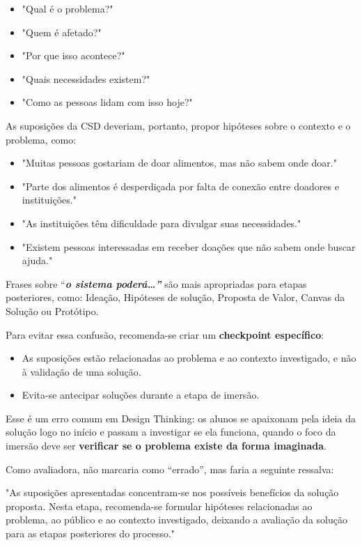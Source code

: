 \documentclass[
  sigconf,
  nonacm, %
  language=portuguese
]{acmart}
\begin{document}
\begin{itemize}[leftmargin=14pt,itemsep=2pt,topsep=4pt]
  \item "Qual é o problema?"
  \item "Quem é afetado?"
  \item "Por que isso acontece?"
  \item "Quais necessidades existem?"
  \item "Como as pessoas lidam com isso hoje?"
\end{itemize}

As suposições da CSD deveriam, portanto, propor hipóteses sobre o contexto e o problema, como:

\begin{itemize}[leftmargin=14pt,itemsep=2pt,topsep=4pt]
  \item "Muitas pessoas gostariam de doar alimentos, mas não sabem onde doar."
  \item "Parte dos alimentos é desperdiçada por falta de conexão entre doadores e instituições."
  \item "As instituições têm dificuldade para divulgar suas necessidades."
  \item "Existem pessoas interessadas em receber doações que não sabem onde buscar ajuda."
\end{itemize}

Frases sobre “\textbf{\textit{o sistema poderá…” }}são mais apropriadas para etapas posteriores, como: Ideação, Hipóteses de solução, Proposta de Valor, Canvas da Solução ou Protótipo.

Para evitar essa confusão, recomenda-se criar um \textbf{checkpoint específico}:

\begin{itemize}[leftmargin=14pt,itemsep=2pt,topsep=4pt]
  \item As suposições estão relacionadas ao problema e ao contexto investigado, e não à validação de uma solução.
  \item Evita-se antecipar soluções durante a etapa de imersão.
\end{itemize}

Esse é um erro comum em Design Thinking: os alunos se apaixonam pela ideia da solução logo no início e passam a investigar se ela funciona, quando o foco da imersão deve ser \textbf{verificar se o problema existe da forma imaginada}.

Como avaliadora, não marcaria como “errado”, mas faria a seguinte ressalva:

"As suposições apresentadas concentram-se nos possíveis benefícios da solução proposta. Nesta etapa, recomenda-se formular hipóteses relacionadas ao problema, ao público e ao contexto investigado, deixando a avaliação da solução para as etapas posteriores do processo."
\end{document}
